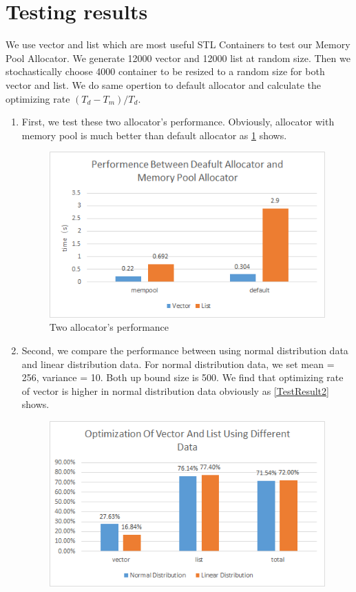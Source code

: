 \documentclass{article}
\begin{document}
\section{Testing results}
We use vector and list which are most useful STL Containers to test our Memory Pool Allocator. We generate 12000 vector and 12000 list at random size. Then we stochastically choose 4000 container to be resized to a random size for both vector and list. We do same opertion to default allocator and calculate the optimizing rate $(T_d - T_m)/T_d$.
\begin{enumerate}
	\item First, we test these two allocator's performance. Obviously, allocator with memory pool is much better than default allocator as \ref{TestResult1} shows.
	\begin{figure}
		\centering
		\includegraphics[]{performance.png}
		\caption{Two allocator's performance\label{TestResult1}}
	\end{figure}
	\item
	Second, we compare the performance between using normal distribution data and linear distribution data. For normal distribution data, we set mean = 256, variance = 10. Both up bound size is 500. We find that optimizing rate of vector is higher in normal distribution data obviously as \ref{TestResult2} shows. 
	\begin{figure}
		\centering
		\includegraphics[]{figure1.png}

\end{figure}
\end{enumerate}
\end{document}
